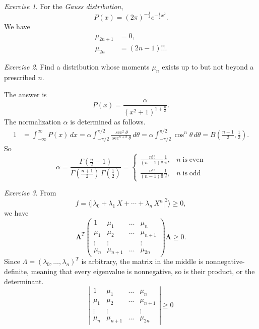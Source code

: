 \documentclass{book}
\numberwithin{equation}{section}
\theoremstyle{plain}
\theoremstyle{definition}
\theoremstyle{remark}
\theoremstyle{BoldStyle}
\newtheorem{exercise}{Exercise}
\numberwithin{exercise}{section}
\begin{document}
\begin{exercise}
For the \emph{Gauss distribution},
\begin{equation}
  P(x) = (2 \pi)^{-\frac 1 2} e^{-\frac{1}{2} x^2}.
\end{equation}
We have
$$
\begin{aligned}
  \mu_{2n+1} &= 0, \\
  \mu_{2n}  &= (2n-1)!!.
\end{aligned}
$$
\end{exercise}

\begin{exercise}
Find a distribution whose moments $\mu_n$ exists up to but not beyond a prescribed $n$.

The answer is
$$
P(x) = \frac{ \alpha } { (x^2 + 1)^{1 + \frac{n}{2} } }.
$$
The normalization $\alpha$ is determined as follows.
$$
\begin{aligned}
1 &= \int_{-\infty}^\infty P(x) \, dx
  = \alpha \int_{-\pi/2}^{\pi/2} \frac{ \sec^2\theta } { \sec^{n+2}\theta } \, d\theta
  =\alpha \int_{-\pi/2}^{\pi/2} \cos^n\theta \, d\theta
  = B\left(\frac{n+1}{2}, \frac{1}{2}\right).
\end{aligned}
$$
So
$$
\alpha = \frac{ \Gamma(\frac n  2 + 1) } { \Gamma(\frac{n+1}{2}) \, \Gamma(\frac 1 2) }
=
\begin{cases}
  \frac{n!!}{(n-1)!! }\frac{1}{\pi}, & n \mathrm{\; is \; even} \\
  \frac{n!!}{(n-1)!! }\frac{1}{2}, & n \mathrm{\; is \; odd}
\end{cases}
$$
\end{exercise}

\begin{exercise}
From
$$
f = \langle
|\lambda_0 + \lambda_1 \, X + \cdots + \lambda_n \, X^n|^2 \rangle \ge 0,
$$
we have
$$
\mathbf \Lambda^T
\left(
  \begin{array}{ccccc}
    1     & \mu_1 & \dots & \mu_n \\
    \mu_1 & \mu_2 & \dots & \mu_{n+1} \\
    \vdots& \vdots&       & \vdots \\
    \mu_n &\mu_{n+1}&\dots& \mu_{2n}
  \end{array}
\right)
\mathbf \Lambda
\ge 0.
$$
Since $\Lambda = (\lambda_0, \dots, \lambda_n)^T$ is arbitrary,
the matrix in the middle is nonnegative-definite,
meaning that every eigenvalue is nonnegative,
so is their product, or the determinant.
$$
\left|
  \begin{array}{ccccc}
    1     & \mu_1 & \dots & \mu_n \\
    \mu_1 & \mu_2 & \dots & \mu_{n+1} \\
    \vdots& \vdots&       & \vdots \\
    \mu_n &\mu_{n+1}&\dots& \mu_{2n}
  \end{array}
\right| \ge 0
$$
\end{exercise}
\end{document}
